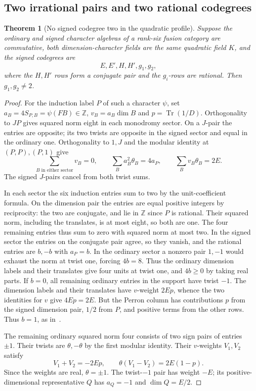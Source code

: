 \documentclass[11pt,reqno]{amsart}
\newtheorem{theorem}{Theorem}[section]
\theoremstyle{remark}\newtheorem{remark}[theorem]{Remark}
\numberwithin{equation}{section}
\begin{document}
\subsection{Two irrational pairs and two rational codegrees}
\begin{theorem}[No signed codegree two in the quadratic profile]
\label{thm:r6-quadratic-no-two}
Suppose the ordinary and signed character algebras of a rank-six
fusion category are commutative, both dimension-character fields
are the same quadratic field $K$, and the signed codegrees are
\[
 E,E',H,H',g_1,g_2,
\]
where the $H,H'$ rows form a conjugate pair and the $g_i$-rows are rational. Then $g_1,g_2\ne2$.
\end{theorem}
\begin{proof}
For the induction label $P$ of such a character $\psi$, set
$a_B=4S_{P,B}=\psi(FB)\in\mathbb Z$, $v_B=a_B\dim B$ and
$p=\operatorname{Tr}(1/D)$. Orthogonality to $JP$ gives squared
norm eight in each monodromy sector. On a $J$-pair the entries are opposite; its two
twists are opposite in the signed sector and equal in the ordinary one. Orthogonality
to $1,J$ and the modular identity at $(P,P),(P,1)$ give
\[
 \sum_{B\text{ in either sector}}v_B=0,\qquad
 \sum_B a_B^2\theta_B=4a_P,\qquad \sum_B v_B\theta_B=2E .
\]
The signed $J$-pairs cancel from both twist sums.

In each sector the six induction entries sum to two by the
unit-coefficient formula. On the dimension pair the entries are equal
positive integers by reciprocity: the two are conjugate, and lie in
$\mathbb Z$ since $P$ is rational. Their squared norm, including the
translates, is at most eight, so both are one. The four remaining
entries thus sum to zero with squared norm at most two. In the signed
sector the entries on the conjugate pair agree, so they vanish, and
the rational entries are $b,-b$ with $a_P=b$. In the ordinary sector
a nonzero pair $1,-1$ would exhaust the norm at twist one, forcing
$4b=8$. Thus the ordinary dimension labels and their translates give
four units at twist one, and $4b\ge0$ by taking real parts.
If $b=0$, all remaining ordinary entries in the support have twist
$-1$. The dimension labels and their translates have $v$-weight
$2Ep$, whence the two identities for $v$ give $4Ep=2E$. But the
Perron column has contributions $p$ from the signed dimension pair,
$1/2$ from $P$, and positive terms from the other rows.
Thus $b=1$, as in~\cite[proof of Theorem~6.2]{Class6Rank5}.

The remaining ordinary squared norm four consists of two sign pairs
of entries $\pm1$. Their twists are $\theta,-\theta$ by the first
modular identity. Their $v$-weights $V_1,V_2$ satisfy
\[
 V_1+V_2=-2Ep,\qquad \theta(V_1-V_2)=2E(1-p).
\]
Since the weights are real, $\theta=\pm1$. The twist-$-1$ pair
has weight $-E$; its positive-dimensional representative $Q$
has $a_Q=-1$ and $\dim Q=E/2$.


\end{proof}
\end{document}
